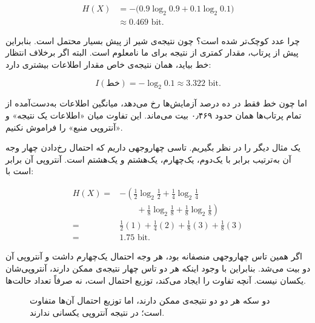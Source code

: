 \[
\begin{aligned}
H(X) &=-\big(0.9\log_2 0.9+0.1\log_2 0.1\big)\\
&\approx 0.469\text{ bit}.
\end{aligned}
\]

چرا عدد کوچک‌تر شده است؟ چون نتیجه‌ی شیر از پیش بسیار محتمل است. بنابراین پیش از پرتاب، مقدار کمتری از نتیجه برای ما نامعلوم است. البته اگر برخلاف انتظار خط بیاید، همان نتیجه‌ی خاص مقدار اطلاعات بیشتری دارد:

\[
I(\text{خط})=-\log_2 0.1\approx 3.322\text{ bit}.
\]

اما چون خط فقط در ده درصد آزمایش‌ها رخ می‌دهد، میانگین اطلاعات به‌دست‌آمده از تمام پرتاب‌ها همان حدود ۰٫۴۶۹ بیت می‌ماند. این تفاوت میان «اطلاعات یک نتیجه» و «آنتروپی منبع» را فراموش نکنیم.

یک مثال دیگر را در نظر بگیریم. تاسی چهاروجهی داریم که احتمال رخ‌دادن چهار وجه آن به‌ترتیب برابر با یک‌دوم، یک‌چهارم، یک‌هشتم و یک‌هشتم است. آنتروپی آن برابر است با:

\[
\begin{aligned}
H(X)={}&-\left(\frac12\log_2\frac12+\frac14\log_2\frac14\right.\\
&\left.\qquad+\frac18\log_2\frac18+\frac18\log_2\frac18\right)\\
={}&\frac12(1)+\frac14(2)+\frac18(3)+\frac18(3)\\
={}&1.75\text{ bit}.
\end{aligned}
\]

اگر همین تاس چهاروجهی منصفانه بود، هر وجه احتمال یک‌چهارم داشت و آنتروپی آن دو بیت می‌شد. بنابراین با وجود اینکه هر دو تاس چهار نتیجه‌ی ممکن دارند، آنتروپی‌شان یکسان نیست. آنچه تفاوت را ایجاد می‌کند، توزیع احتمال است، نه صرفاً تعداد حالت‌ها.

\begin{figure}[htbp]
\centering
{}
\caption{دو سکه هر دو دو نتیجه‌ی ممکن دارند، اما توزیع احتمال آن‌ها متفاوت است؛ در نتیجه آنتروپی یکسانی ندارند.}
\label{fig:coin-entropy}
\end{figure}

